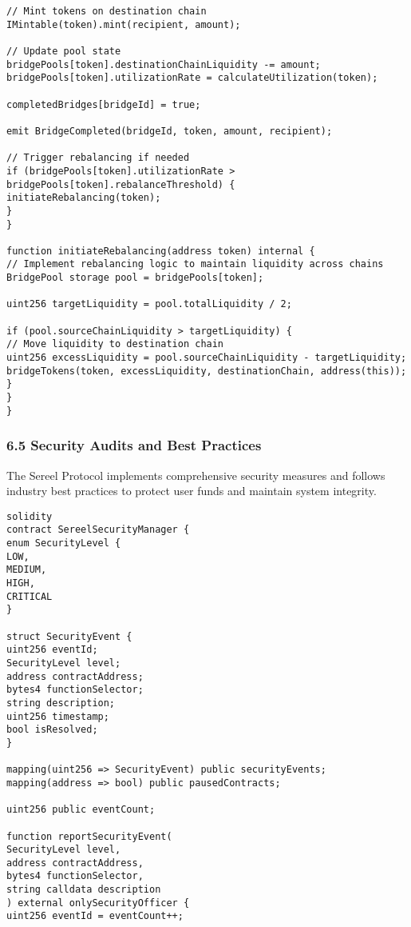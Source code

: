 \documentclass[12pt]{article}
\begin{document}
{{{\begin{lstlisting}
// Mint tokens on destination chain
IMintable(token).mint(recipient, amount);

// Update pool state
bridgePools[token].destinationChainLiquidity -= amount;
bridgePools[token].utilizationRate = calculateUtilization(token);

completedBridges[bridgeId] = true;

emit BridgeCompleted(bridgeId, token, amount, recipient);

// Trigger rebalancing if needed
if (bridgePools[token].utilizationRate > bridgePools[token].rebalanceThreshold) {
initiateRebalancing(token);
}
}

function initiateRebalancing(address token) internal {
// Implement rebalancing logic to maintain liquidity across chains
BridgePool storage pool = bridgePools[token];

uint256 targetLiquidity = pool.totalLiquidity / 2;

if (pool.sourceChainLiquidity > targetLiquidity) {
// Move liquidity to destination chain
uint256 excessLiquidity = pool.sourceChainLiquidity - targetLiquidity;
bridgeTokens(token, excessLiquidity, destinationChain, address(this));
}
}
}
\end{lstlisting}

\subsubsection{6.5 Security Audits and Best Practices} %

The Sereel Protocol implements comprehensive security measures and follows industry best practices to protect user funds and maintain system integrity.



\begin{lstlisting}
solidity
contract SereelSecurityManager {
enum SecurityLevel {
LOW,
MEDIUM,
HIGH,
CRITICAL
}

struct SecurityEvent {
uint256 eventId;
SecurityLevel level;
address contractAddress;
bytes4 functionSelector;
string description;
uint256 timestamp;
bool isResolved;
}

mapping(uint256 => SecurityEvent) public securityEvents;
mapping(address => bool) public pausedContracts;

uint256 public eventCount;

function reportSecurityEvent(
SecurityLevel level,
address contractAddress,
bytes4 functionSelector,
string calldata description
) external onlySecurityOfficer {
uint256 eventId = eventCount++;


\end{lstlisting}}}}
\end{document}
